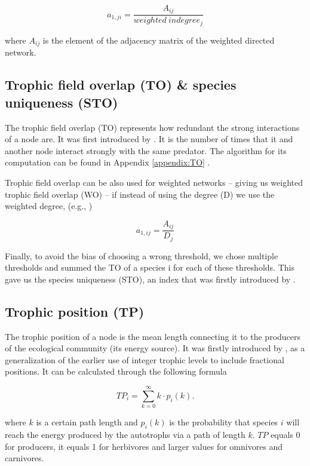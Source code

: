 \documentclass[twocolumn]{article}
\begin{document}
						\begin{equation}
							a_{1,ji}=\frac{A_{ij}}{weighted\:indegree_j}
						\end{equation}

		\noindent where $A_{ij}$ is the element of the adjacency matrix of the weighted directed network.

	\subsection*{Trophic field overlap (TO) & species uniqueness (STO)}

		The trophic field overlap (TO) represents how redundant the strong interactions of a node are. It was first introduced by \citet{Jordan2009a}. It is the number of times that it and another node interact strongly with the same predator. The algorithm for its computation can be found in Appendix \ref{appendix:TO} \citep{Jordan2018}.


		Trophic field overlap can be also used for weighted networks – giving us weighted trophic field overlap (WO) – if instead of using the degree (D) we use the weighted degree, (e.g., \citet{Xiao2019})

						\begin{equation}
							a_{1,ij}=\frac{A_{ij}}{D_j}
						\end{equation}

		Finally, to avoid the bias of choosing a wrong threshold, we chose multiple thresholds and summed the TO of a species i for each of these thresholds. This gave us the species uniqueness (STO), an index that was firstly introduced by \citet{Lai2015}.

	\subsection*{Trophic position (TP)}

		The trophic position of a node is the mean length connecting it to the producers of the ecological community (its energy source). It was firstly introduced by \citet{Levine1980}, as a generalization of the earlier use of integer trophic levels to include fractional positions. It can be calculated through the following formula

						\begin{equation}
							TP_i=\sum\limits_{k=0}^\infty k \cdot p_i(k).
						\end{equation}

		\noindent where $k$ is a certain path length and $p_i(k)$ is the probability that species $i$ will reach the energy produced by the autotrophs via a path of length $k$. $TP$ equals 0 for producers, it equals 1 for herbivores and larger values for omnivores and carnivores.
\end{document}
